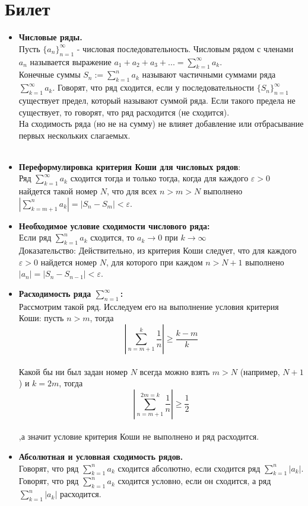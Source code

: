 \documentclass[12pt,a4paper]{article}
\begin{document}
\section{Билет}
\begin{itemize}
  \item \textbf{Числовые ряды.}\\
  Пусть $\{a_n\}_{n=1}^{\infty}$ - числовая последовательность. Числовым рядом с членами $a_n$ называется выражение $a_1 + a_2 + a_3 + ... =  \sum_{k = 1}^{\infty} a_k$.\\
  Конечные суммы $S_n := \sum_{k = 1}^n a_k$ называют частичными суммами ряда $\sum_{k = 1}^{\infty} a_k$. Говорят, что ряд сходится, если у последовательности $\{S_n\}_{n = 1}^{\infty}$ существует предел, который называют суммой ряда. Если такого предела не существует, то говорят, что ряд расходится (не сходится).\\
  На сходимость ряда (но не на сумму) не влияет добавление или отбрасывание первых нескольких слагаемых.\\
  \\
  \item \textbf{Переформулировка критерия Коши для числовых рядов}:\\
  Ряд $\sum_{k = 1}^{\infty} a_k$ сходится тогда и только тогда, когда для каждого $\varepsilon > 0$ найдется такой номер $N$, что для всех $n > m > N$ выполнено $|\sum_{k = m + 1}^n a_k| = |S_n - S_m| < \varepsilon$.\\
  \item \textbf{Необходимое условие сходимости числового ряда:}\\
  Если ряд $\sum_{k = 1}^n a_k$  сходится, то $a_k \to 0$ при $k \to \infty$\\
  Доказательство: Действительно, из критерия Коши следует, что для каждого $\varepsilon > 0$ найдется номер $N$, для которого при каждом $n > N + 1$ выполнено $|a_n| = |S_n - S_{n - 1}| < \varepsilon$.
  \item \textbf{Расходимость ряда $\sum_{n = 1}^{\infty}$:}\\
  Рассмотрим такой ряд. Исследуем его на выполнение условия критерия Коши: пусть $n > m$, тогда 
\[
  |\sum_{n = m + 1}^k \frac{1}{n}| \geq \frac{k - m}{k}
\]\\
  Какой бы ни был задан номер $N$ всегда можно взять $m > N$ (например, $N + 1$ ) и $k = 2m$, тогда 
\[
  |\sum_{n = m + 1}^{2m = k} \frac{1}{n}| \geq \frac{1}{2}
\]\\
  ,а значит условие критерия Коши не выполнено и ряд расходится.
\item \textbf{Абсолютная и условная сходимость рядов.} \\
Говорят, что ряд $\sum_{k = 1}^n a_k$ сходится абсолютно, если сходится ряд $\sum_{k = 1}^n |a_k|$.\\
Говорят, что ряд $\sum_{k = 1}^n a_k$ сходится условно, если он сходится, а ряд $\sum_{k = 1}^n |a_k|$ расходится.
\end{itemize}
\end{document}
